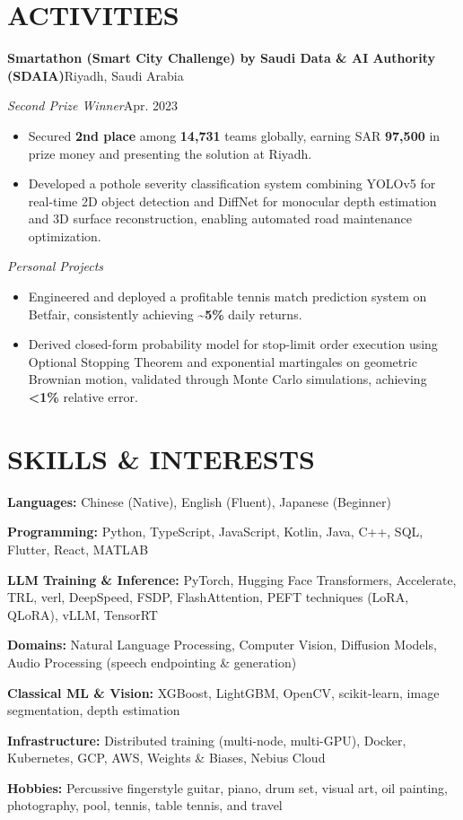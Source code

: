 \documentclass[10pt,a4paper]{article}
\newcommand{\headerinfo}[2]{%
    \textit{#1}\hfill #2\par\vspace{-0.5\baselineskip}%
}
\newcommand{\experience}[4]{%
    \textbf{#1}\hfill #2\par\vspace{-0.5\baselineskip}%
    \textit{#3}\hfill #4\par\vspace{-0.5\baselineskip}%
}
\begin{document}
\section{ACTIVITIES}
\experience{Smartathon (Smart City Challenge) by Saudi Data \& AI Authority (SDAIA)}{Riyadh, Saudi Arabia}
{Second Prize Winner}{Apr. 2023}
\begin{itemize}
    \item Secured \textbf{2nd place} among \textbf{14,731} teams globally, earning SAR \textbf{97,500} in prize money and presenting the solution at Riyadh.
    \item Developed a pothole severity classification system combining YOLOv5 for real-time 2D object detection and DiffNet for monocular depth estimation and 3D surface reconstruction, enabling automated road maintenance optimization.
\end{itemize}

\headerinfo{Personal Projects}{}
\begin{itemize}
    \item Engineered and deployed a profitable tennis match prediction system on Betfair, consistently achieving \textbf{\textasciitilde{}5\%} daily returns.
    \item Derived closed-form probability model for stop-limit order execution using Optional Stopping Theorem and exponential martingales on geometric Brownian motion, validated through Monte Carlo simulations, achieving \textbf{<1\%} relative error.
\end{itemize}

\section{SKILLS \& INTERESTS}
\textbf{Languages:} Chinese (Native), English (Fluent), Japanese (Beginner)\par\vspace{-0.3\baselineskip}
\textbf{Programming:} Python, TypeScript, JavaScript, Kotlin, Java, C++, SQL, Flutter, React, MATLAB\par\vspace{-0.3\baselineskip}
\textbf{LLM Training \& Inference:} PyTorch, Hugging Face Transformers, Accelerate, TRL, verl, DeepSpeed, FSDP, FlashAttention, PEFT techniques (LoRA, QLoRA), vLLM, TensorRT\par\vspace{-0.3\baselineskip}
\textbf{Domains:} Natural Language Processing, Computer Vision, Diffusion Models, Audio Processing (speech endpointing \& generation)\par\vspace{-0.3\baselineskip}
\textbf{Classical ML \& Vision:} XGBoost, LightGBM, OpenCV, scikit-learn, image segmentation, depth estimation\par\vspace{-0.3\baselineskip}
\textbf{Infrastructure:} Distributed training (multi-node, multi-GPU), Docker, Kubernetes, GCP, AWS, Weights \& Biases, Nebius Cloud\par\vspace{-0.3\baselineskip}
\textbf{Hobbies:} Percussive fingerstyle guitar, piano, drum set, visual art, oil painting, photography, pool, tennis, table tennis, and travel
\end{document}
